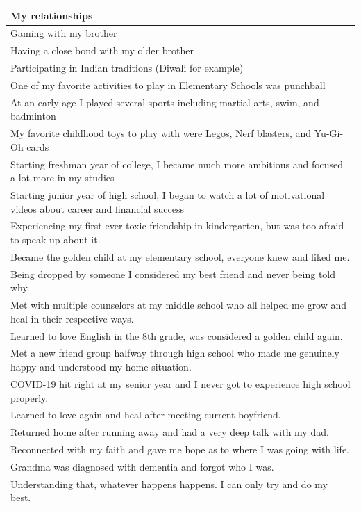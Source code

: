 \documentclass[
  .7em,
  letterpaper,
  DIV=11,
  numbers=noendperiod]{scrartcl}
\begin{document}
\begin{table}
\begin{tabular}{l}
\hline
My relationships\\
\hline
Gaming with my brother\\
\hline
Having a close bond with my older brother\\
\hline
Participating in Indian traditions (Diwali for example)\\
\hline
One of my favorite activities to play in Elementary Schools was punchball\\
\hline
At an early age I played several sports including martial arts, swim, and badminton\\
\hline
My favorite childhood toys to play with were Legos, Nerf blasters, and  Yu-Gi-Oh cards\\
\hline
Starting freshman year of college, I became much more ambitious and focused a lot more in my studies\\
\hline
Starting junior year of high school, I began to watch a lot of motivational videos about career and financial success\\
\hline
Experiencing my first ever toxic friendship in kindergarten, but was too afraid to speak up about it.\\
\hline
Became the golden child at my elementary school, everyone knew and liked me.\\
\hline
Being dropped by someone I considered my best friend and never being told why.\\
\hline
Met with multiple counselors at my middle school who all helped me grow and heal in their respective ways.\\
\hline
Learned to love English in the 8th grade, was considered a golden child again.\\
\hline
Met a new friend group halfway through high school who made me genuinely happy and understood my home situation.\\
\hline
COVID-19 hit right at my senior year and I never got to experience high school properly.\\
\hline
Learned to love again and heal after meeting current boyfriend.\\
\hline
Returned home after running away and had a very deep talk with my dad.\\
\hline
Reconnected with my faith and gave me hope as to where I was going with life.\\
\hline
Grandma was diagnosed with dementia and forgot who I was.\\
\hline
Understanding that, whatever happens happens. I can only try and do my best.\\

\end{tabular}
\end{table}
\end{document}
